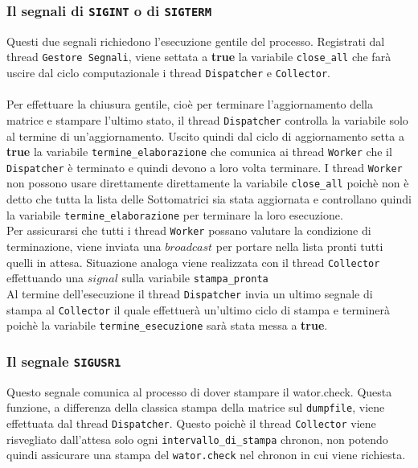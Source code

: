 \documentclass[]{article}
\begin{document}
\subsubsection{Il segnali di \texttt{SIGINT} o di \texttt{SIGTERM}}
Questi due segnali richiedono l'esecuzione gentile del processo. Registrati dal thread \texttt{Gestore Segnali}, viene settata a \textbf{true} la variabile \texttt{close\_all} che farà uscire dal ciclo computazionale i thread \texttt{Dispatcher} e \texttt{Collector}.\\ \\
Per effettuare la chiusura gentile, cioè per terminare l'aggiornamento della matrice e stampare l'ultimo stato, il thread \texttt{Dispatcher} controlla la variabile solo al termine di un'aggiornamento. Uscito quindi dal ciclo di aggiornamento setta a \textbf{true} la variabile \texttt{termine\_elaborazione} che comunica ai thread \texttt{Worker} che il \texttt{Dispatcher} è terminato e quindi devono a loro volta terminare. I thread \texttt{Worker} non possono usare direttamente direttamente la variabile \texttt{close\_all} poichè non è detto che tutta la lista delle Sottomatrici sia stata aggiornata e controllano quindi la variabile \texttt{termine\_elaborazione} per terminare la loro esecuzione.\\

Per assicurarsi che tutti i thread \texttt{Worker} possano valutare la condizione di terminazione, viene inviata una $broadcast$ per portare nella lista pronti tutti quelli in attesa. Situazione analoga viene realizzata con il thread \texttt{Collector} effettuando una $signal$ sulla variabile \texttt{stampa\_pronta} \\ 

Al termine dell'esecuzione il thread \texttt{Dispatcher} invia un ultimo segnale di stampa al \texttt{Collector} il quale effettuerà un'ultimo ciclo di stampa e terminerà poichè la variabile \texttt{termine\_esecuzione} sarà stata messa a \textbf{true}. 

\subsubsection{Il segnale \texttt{SIGUSR1}}
Questo segnale comunica al processo di dover stampare il wator.check. Questa funzione, a differenza della classica stampa della matrice sul \texttt{dumpfile}, viene effettuata dal thread \texttt{Dispatcher}. Questo poichè il thread \texttt{Collector} viene risvegliato dall'attesa solo ogni \texttt{intervallo\_di\_stampa} chronon, non potendo quindi assicurare una stampa  del \texttt{wator.check} nel chronon in cui viene richiesta.
\end{document}
